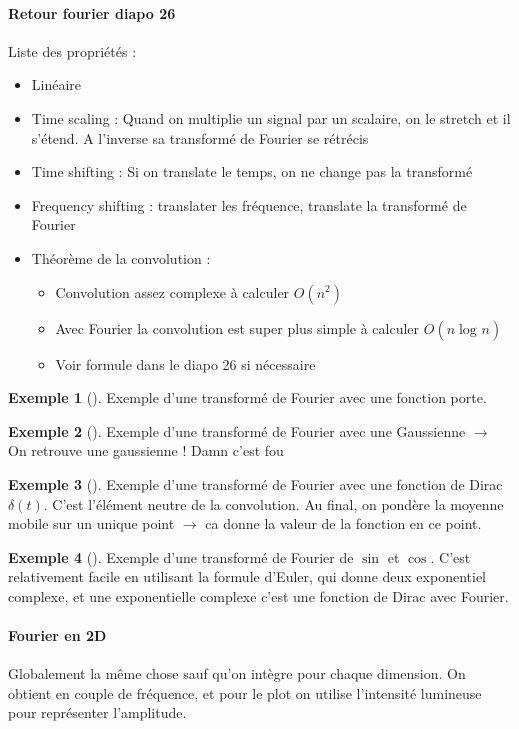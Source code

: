 \documentclass{article}
\theoremstyle{plain}%
\theoremstyle{definition}
\newtheorem{exmp}{Exemple}[section]
\theoremstyle{remark}
\begin{document}
\paragraph*{Retour fourier diapo 26} 
Liste des propriétés :\begin{itemize}
    \item Linéaire
    \item Time scaling : Quand on multiplie un signal par un scalaire, on le stretch et il s'étend. A l'inverse sa transformé de Fourier se rétrécis 
    \item Time shifting : Si on translate le temps, on ne change pas la transformé
    \item Frequency shifting : translater les fréquence, translate la transformé de Fourier
    \item Théorème de la convolution : \begin{itemize}
        \item  Convolution assez complexe à calculer $ O(n^2) $ 
        \item Avec Fourier la convolution est super plus simple à calculer $ O(n \log_{}n) $ 
        \item Voir formule dans le diapo 26 si nécessaire
    \end{itemize}
\end{itemize}
\begin{exmp}[]
    Exemple d'une transformé de Fourier avec une fonction porte.
\end{exmp}
\begin{exmp}[]
    Exemple d'une transformé de Fourier avec une Gaussienne $\rightarrow$ On retrouve une gaussienne ! Damn c'est fou
\end{exmp}
\begin{exmp}[]
    Exemple d'une transformé de Fourier avec une fonction de Dirac $ \delta (t) $. C'est l'élément neutre de la convolution. Au final, on pondère la moyenne mobile sur un unique point $\rightarrow$ ca donne la valeur de la fonction en ce point. 
\end{exmp}
\begin{exmp}[]
    Exemple d'une transformé de Fourier de $ \sin  $ et $ \cos  $. C'est relativement facile en utilisant la formule d'Euler, qui donne deux exponentiel complexe, et une exponentielle complexe c'est une fonction de Dirac avec Fourier.
\end{exmp}

\paragraph*{Fourier en 2D}
Globalement la même chose sauf qu'on intègre pour chaque dimension. On obtient en couple de fréquence, et pour le plot on utilise l'intensité lumineuse pour représenter l'amplitude.
\end{document}
